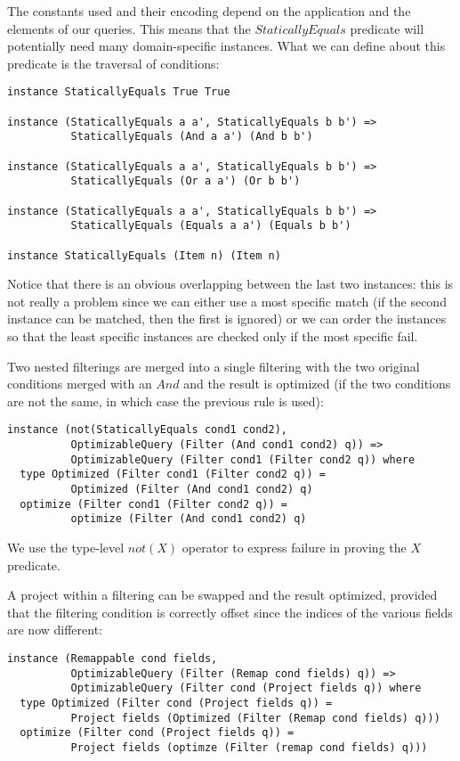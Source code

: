 The constants used and their encoding depend on the application and the elements of our queries. This means that the $StaticallyEquals$ predicate will potentially need many domain-specific instances. What we can define about this predicate is the traversal of conditions:

\begin{lstlisting}
instance StaticallyEquals True True

instance (StaticallyEquals a a', StaticallyEquals b b') =>
          StaticallyEquals (And a a') (And b b')

instance (StaticallyEquals a a', StaticallyEquals b b') =>
          StaticallyEquals (Or a a') (Or b b')

instance (StaticallyEquals a a', StaticallyEquals b b') =>
          StaticallyEquals (Equals a a') (Equals b b')

instance StaticallyEquals (Item n) (Item n)
\end{lstlisting}

Notice that there is an obvious overlapping between the last two instances: this is not really a problem since we can either use a most specific match (if the second instance can be matched, then the first is ignored) or we can order the instances so that the least specific instances are checked only if the most specific fail.

Two nested filterings are merged into a single filtering with the two original conditions merged with an $And$ and the result is optimized (if the two conditions are not the same, in which case the previous rule is used):
\begin{lstlisting}
instance (not(StaticallyEquals cond1 cond2), 
          OptimizableQuery (Filter (And cond1 cond2) q)) => 
          OptimizableQuery (Filter cond1 (Filter cond2 q)) where
  type Optimized (Filter cond1 (Filter cond2 q)) = 
          Optimized (Filter (And cond1 cond2) q)
  optimize (Filter cond1 (Filter cond2 q)) = 
          optimize (Filter (And cond1 cond2) q)
\end{lstlisting}

We use the type-level $not(X)$ operator to express failure in proving the $X$ predicate.

A project within a filtering can be swapped and the result optimized, provided that the filtering condition is correctly offset since the indices of the various fields are now different:
\begin{lstlisting}
instance (Remappable cond fields, 
          OptimizableQuery (Filter (Remap cond fields) q)) => 
          OptimizableQuery (Filter cond (Project fields q)) where
  type Optimized (Filter cond (Project fields q)) = 
          Project fields (Optimized (Filter (Remap cond fields) q)))
  optimize (Filter cond (Project fields q)) = 
          Project fields (optimze (Filter (remap cond fields) q)))
\end{lstlisting}

